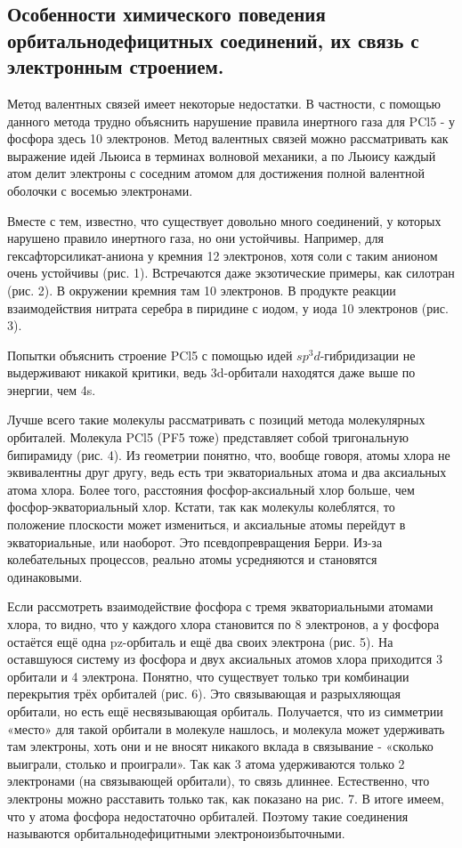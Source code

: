 \documentclass[14pt,a4paper]{scrartcl}
\begin{document}
\subsection{Особенности химического поведения орбитальнодефицитных соединений, их связь с электронным строением.}

Метод валентных связей имеет некоторые недостатки. В частности, с помощью данного метода трудно объяснить нарушение правила инертного газа для PCl5 - у фосфора здесь 10
электронов. Метод валентных связей можно рассматривать как выражение идей Льюиса в терминах волновой механики, а по Льюису каждый атом делит электроны с соседним атомом для
достижения полной валентной оболочки с восемью электронами. 


Вместе с тем, известно, что существует довольно много соединений, у которых нарушено правило инертного газа, но они устойчивы. Например, для гексафторсиликат-аниона у кремния 12
электронов, хотя соли с таким анионом очень устойчивы (рис. 1). Встречаются даже экзотические примеры, как силотран (рис. 2). В окружении кремния там 10 электронов. В продукте
реакции взаимодействия нитрата серебра в пиридине с иодом, у иода 10 электронов (рис. 3).

Попытки объяснить строение PCl5 с помощью идей $sp^3d$-гибридизации не выдерживают никакой критики, ведь 3d-орбитали находятся даже выше по энергии, чем 4s. 

Лучше всего такие молекулы рассматривать с позиций метода молекулярных орбиталей. Молекула PCl5 (PF5 тоже) представляет собой тригональную бипирамиду (рис. 4). Из геометрии
понятно, что, вообще говоря, атомы хлора не эквивалентны друг другу, ведь есть три экваториальных атома и два аксиальных атома хлора. Более того, расстояния фосфор-аксиальный хлор
больше, чем фосфор-экваториальный хлор. Кстати, так как молекулы колеблятся, то положение плоскости может измениться, и аксиальные атомы перейдут в экваториальные, или
наоборот. Это псевдопревращения Берри. Из-за колебательных процессов, реально атомы усредняются и становятся одинаковыми.

Если рассмотреть взаимодействие фосфора с тремя экваториальными атомами хлора, то видно, что у каждого хлора становится по 8 электронов, а у фосфора остаётся ещё одна pz-орбиталь
и ещё два своих электрона (рис. 5). На оставшуюся систему из фосфора и двух аксиальных атомов хлора приходится 3 орбитали и 4 электрона. Понятно, что существует только три
комбинации перекрытия трёх орбиталей (рис. 6). Это связывающая и разрыхляющая орбитали, но есть ещё несвязывающая орбиталь. Получается, что из симметрии «место» для такой
орбитали в молекуле нашлось, и молекула может удерживать там электроны, хоть они и не вносят никакого вклада в связывание - «сколько выиграли, столько и проиграли». Так как 3 атома
удерживаются только 2 электронами (на связывающей орбитали), то связь длиннее. Естественно, что электроны можно расставить только так, как показано на рис. 7. В итоге имеем, что у
атома фосфора недостаточно орбиталей. Поэтому такие соединения называются орбитальнодефицитными электроноизбыточными. 
\end{document}
